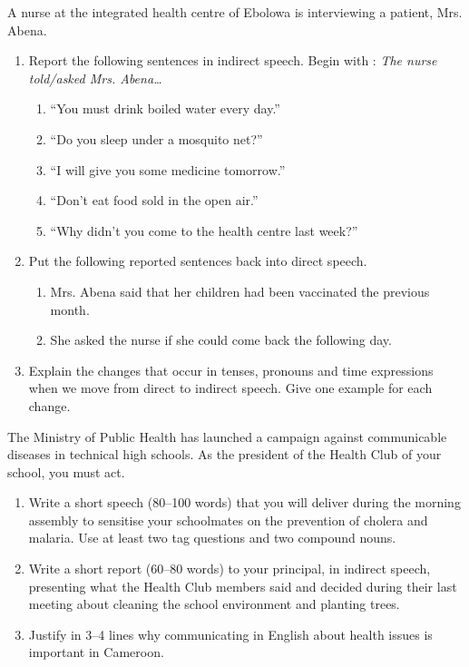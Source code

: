 \documentclass[11pt]{article}
\begin{document}
\begin{exercice}
A nurse at the integrated health centre of Ebolowa is interviewing a patient, Mrs. Abena.
\begin{enumerate}
\item Report the following sentences in indirect speech. Begin with : \textit{The nurse told/asked Mrs. Abena\ldots}
\begin{enumerate}
\item ``You must drink boiled water every day.''
\item ``Do you sleep under a mosquito net?''
\item ``I will give you some medicine tomorrow.''
\item ``Don't eat food sold in the open air.''
\item ``Why didn't you come to the health centre last week?''
\end{enumerate}
\item Put the following reported sentences back into direct speech.
\begin{enumerate}
\item Mrs. Abena said that her children had been vaccinated the previous month.
\item She asked the nurse if she could come back the following day.
\end{enumerate}
\item Explain the changes that occur in tenses, pronouns and time expressions when we move from direct to indirect speech. Give one example for each change.
\end{enumerate}
\end{exercice}

\begin{exercice}
The Ministry of Public Health has launched a campaign against communicable diseases in technical high schools. As the president of the Health Club of your school, you must act.
\begin{enumerate}
\item Write a short speech (80--100 words) that you will deliver during the morning assembly to sensitise your schoolmates on the prevention of cholera and malaria. Use at least two tag questions and two compound nouns.
\item Write a short report (60--80 words) to your principal, in indirect speech, presenting what the Health Club members said and decided during their last meeting about cleaning the school environment and planting trees.
\item Justify in 3--4 lines why communicating in English about health issues is important in Cameroon.
\end{enumerate}
\end{exercice}
\end{document}
